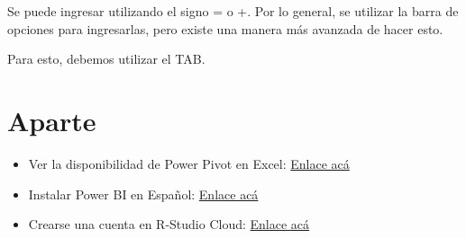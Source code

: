 \documentclass[12 pt,letterpaper]{article}
\begin{document}
Se puede ingresar utilizando el signo = o +. Por lo general, se utilizar la barra de opciones para ingresarlas, pero existe una manera más avanzada de hacer esto. 

Para esto, debemos utilizar el TAB.

\section{Aparte}

\begin{itemize}
	\item Ver la disponibilidad de Power Pivot en Excel: \href{https://support.microsoft.com/es-es/office/iniciar-el-complemento-power-pivot-para-excel-a891a66d-36e3-43fc-81e8-fc4798f39ea8}{Enlace acá}	
	
	\item Instalar Power BI en Español: \href{https://powerbi.microsoft.com/es-es/desktop/}{Enlace acá}
	
	\item Crearse una cuenta en R-Studio Cloud: \href{https://rstudio.cloud/}{Enlace acá}
		
\end{itemize}
\end{document}
